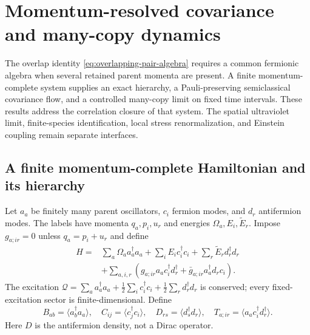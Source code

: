 \documentclass[11pt,a4paper,oneside]{book}
\theoremstyle{plain}
\theoremstyle{definition}
\theoremstyle{remark}
\begin{document}
\chapter{Momentum-resolved covariance and many-copy dynamics}
\label{ch:momentum-covariance}
The overlap identity \eqref{eq:overlapping-pair-algebra} requires a
common fermionic algebra when several retained parent momenta are
present.  A finite momentum-complete system supplies an exact hierarchy,
a Pauli-preserving semiclassical covariance flow, and a controlled
many-copy limit on fixed time intervals.  These results address the
correlation closure of that system.  The spatial ultraviolet limit,
finite-species identification, local stress renormalization, and
Einstein coupling remain separate interfaces.

\section{A finite momentum-complete Hamiltonian and its hierarchy}
\label{sec:momentum-quantum-hierarchy}
Let $a_a$ be finitely many parent oscillators, $c_i$ fermion modes, and
$d_r$ antifermion modes.  The labels have momenta $q_a,p_i,u_r$ and
energies $\Omega_a,E_i,\widetilde E_r$.  Impose
$g_{a;ir}=0$ unless $q_a=p_i+u_r$ and define
\begin{equation}
 \begin{split}
 H={}&\sum_a\Omega_a a_a^\dagger a_a
 +\sum_iE_i c_i^\dagger c_i+\sum_r\widetilde E_r d_r^\dagger d_r\\
 &+\sum_{a,i,r}\left(g_{a;ir}a_ac_i^\dagger d_r^\dagger
                   +\bar g_{a;ir}a_a^\dagger d_rc_i\right).
 \end{split}
 \label{eq:momentum-complete-hamiltonian}
\end{equation}
The excitation
$\mathcal Q=\sum_a a_a^\dagger a_a+\tfrac12\sum_i c_i^\dagger c_i
+\tfrac12\sum_r d_r^\dagger d_r$ is conserved; every fixed-excitation
sector is finite-dimensional.  Define
\begin{equation}
 B_{ab}=\langle a_b^\dagger a_a\rangle,\quad
 C_{ij}=\langle c_j^\dagger c_i\rangle,\quad
 D_{rs}=\langle d_s^\dagger d_r\rangle,\quad
 T_{a;ir}=\langle a_ac_i^\dagger d_r^\dagger\rangle.
 \label{eq:momentum-hierarchy-variables}
\end{equation}
Here $D$ is the antifermion density, not a Dirac operator.
\end{document}
